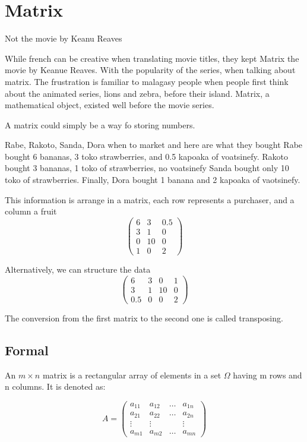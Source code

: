 \documentclass[
  letterpaper,
  DIV=11,
  numbers=noendperiod]{scrreprt}
\begin{document}
\chapter{Matrix}\label{sec-matrixMath}

Not the movie by Keanu Reaves

While french can be creative when translating movie titles, they kept
Matrix the movie by Keanue Reaves. With the popularity of the series,
when talking about matrix. The frustration is familiar to malagasy
people when people first think about the animated series, lions and
zebra, before their island. Matrix, a mathematical object, existed well
before the movie series.

A matrix could simply be a way fo storing numbers.

Rabe, Rakoto, Sanda, Dora when to market and here are what they bought
Rabe bought 6 bananas, 3 toko strawberries, and 0.5 kapoaka of
voatsinefy. Rakoto bought 3 bananas, 1 toko of strawberries, no
voatsinefy Sanda bought only 10 toko of strawberries. Finally, Dora
bought 1 banana and 2 kapoaka of vaotsinefy.

This information is arrange in a matrix, each row represents a
purchaser, and a column a fruit \[
\begin{pmatrix}
    6 & 3 & 0.5 \\
    3 & 1 & 0 \\
    0 & 10 & 0 \\
    1 & 0 & 2
\end{pmatrix}
\]

Alternatively, we can structure the data \[
\begin{pmatrix}
6 & 3 & 0 & 1 \\
3 & 1 & 10 & 0 \\
0.5 & 0 & 0 & 2
\end{pmatrix}
\]

The conversion from the first matrix to the second one is called
transposing.

\section*{Formal}\label{formal-4}


An \(m \times n\) matrix is a rectangular array of elements in a set
\(\Omega\) having m rows and n columns. It is denoted as:

\[
A =
\begin{pmatrix}
    a_{11} & a_{12} & \dots & a_{1n} \\
    a_{21} & a_{22} & \dots & a_{2n} \\
    \vdots & \vdots & & \vdots \\
    a_{m1} & a_{m2} & \dots & a_{mn}
\end{pmatrix}
\]
\end{document}
